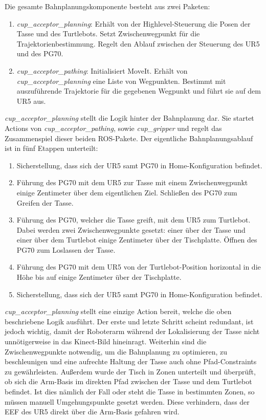 Die gesamte Bahnplanungskomponente besteht aus zwei Paketen:
\begin{enumerate}
	\item \textit{cup\_acceptor\_planning}:
				\newline
				Erhält von der Highlevel-Steuerung die Posen der Tasse und des Turtlebots. Setzt Zwischenwegpunkt für die Trajektorienbestimmung. Regelt den Ablauf zwischen der Steuerung des UR5 und des PG70.
	\item \textit{cup\_acceptor\_pathing}:
				\newline
				Initialisiert MoveIt. Erhält von \textit{cup\_acceptor\_planning} eine Liste von Wegpunkten. Bestimmt mit auszuführende Trajektorie für die gegebenen Wegpunkt und führt sie auf dem UR5 aus.
\end{enumerate}
\textit{cup\_acceptor\_planning} stellt die Logik hinter der Bahnplanung dar. Sie startet Actions von \textit{cup\_acceptor\_pathing}, sowie \textit{cup\_gripper} und regelt das Zusammenspiel dieser beiden ROS-Pakete. Der eigentliche Bahnplanungsablauf ist in fünf Etappen unterteilt:
\begin{enumerate}
	\item Sicherstellung, dass sich der UR5 samt PG70 in Home-Konfiguration befindet.
	\item Führung des PG70 mit dem UR5 zur Tasse mit einem Zwischenwegpunkt einige Zentimeter über dem eigentlichen Ziel. Schließen des PG70 zum Greifen der Tasse.
	\item Führung des PG70, welcher die Tasse greift, mit dem UR5 zum Turtlebot. Dabei werden zwei Zwischenwegpunkte gesetzt: einer über der Tasse und einer über dem Turtlebot einige Zentimeter über der Tischplatte. Öffnen des PG70 zum Loslassen der Tasse.
	\item Führung des PG70 mit dem UR5 von der Turtlebot-Position horizontal in die Höhe bis auf einige Zentimeter über der Tischplatte.
	\item Sicherstellung, dass sich der UR5 samt PG70 in Home-Konfiguration befindet.
\end{enumerate}
\textit{cup\_acceptor\_planning} stellt eine einzige Action bereit, welche die oben beschriebene Logik ausführt. Der erste und letzte Schritt scheint redundant, ist jedoch wichtig, damit der Roboterarm während der Lokalisierung der Tasse nicht unnötigerweise in das Kinect-Bild hineinragt. Weiterhin sind die Zwischenwegpunkte notwendig, um die Bahnplanung zu optimieren, zu beschleunigen und eine aufrechte Haltung der Tasse auch ohne Pfad-Constraints zu gewährleisten. Außerdem wurde der Tisch in Zonen unterteilt und überprüft, ob sich die Arm-Basis im direkten Pfad zwischen der Tasse und dem Turtlebot befindet. Ist dies nämlich der Fall oder steht die Tasse in bestimmten Zonen, so müssen manuell Umgehungspunkte gesetzt werden. Diese verhindern, dass der EEF des UR5 direkt über die Arm-Basis gefahren wird.

